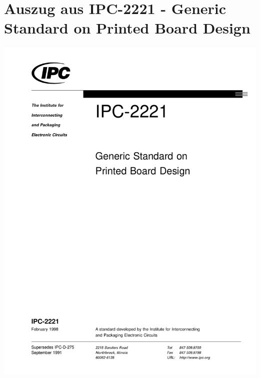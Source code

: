 \section{Auszug aus IPC-2221 - Generic Standard on
Printed Board Design}
\begin{center} \label{app:ipc}
	\includegraphics[page=50,width=0.98\columnwidth]{./datenblaetter/IPC-2221-2}
\end{center}

